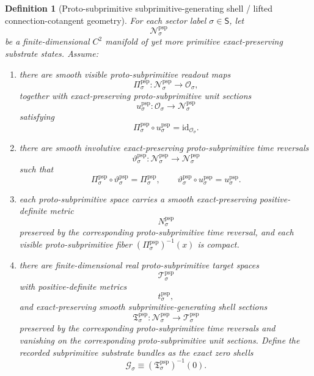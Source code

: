 \documentclass[11pt]{article}
\newcommand{\SectorSet}{\mathsf S}
\newcommand{\ObjClass}[1]{\mathcal O_{#1}}
\newcommand{\ProtoSubprimTarget}[1]{\mathcal T_{#1}^{\mathrm{psp}}}
\newcommand{\ProtoSubprimTargetMetric}[1]{t_{#1}^{\mathrm{psp}}}
\newcommand{\SubprimSpace}[1]{\mathcal G_{#1}}
\newcommand{\ProtoSubprimSpace}[1]{\mathcal N_{#1}^{\mathrm{psp}}}
\newcommand{\ProtoSubprimRead}[1]{\Pi_{#1}^{\mathrm{psp}}}
\newcommand{\ProtoSubprimUnit}[1]{u_{#1}^{\mathrm{psp}}}
\newcommand{\ProtoSubprimTimeRev}[1]{\vartheta_{#1}^{\mathrm{psp}}}
\newcommand{\ProtoSubprimMetric}[1]{N_{#1}^{\mathrm{psp}}}
\newcommand{\ProtoSubprimSection}[1]{\mathfrak T_{#1}^{\mathrm{psp}}}
\newtheorem{definition}{Definition}
\begin{document}
\begin{definition}[Proto-subprimitive subprimitive-generating shell / lifted connection-cotangent geometry]
\label{def:protosubprimitive_geometry}
For each sector label \(\sigma\in\SectorSet\), let
\[
\ProtoSubprimSpace{\sigma}
\]
be a finite-dimensional \(C^2\) manifold of yet more primitive exact-preserving substrate states. Assume:
\begin{enumerate}
    \item there are smooth visible proto-subprimitive readout maps
    \[
    \ProtoSubprimRead{\sigma}:\ProtoSubprimSpace{\sigma}\to\ObjClass{\sigma},
    \]
    together with exact-preserving proto-subprimitive unit sections
    \[
    \ProtoSubprimUnit{\sigma}:\ObjClass{\sigma}\to\ProtoSubprimSpace{\sigma}
    \]
    satisfying
    \[
    \ProtoSubprimRead{\sigma}\circ\ProtoSubprimUnit{\sigma}=\mathrm{id}_{\ObjClass{\sigma}}.
    \]
    \item there are smooth involutive exact-preserving proto-subprimitive time reversals
    \[
    \ProtoSubprimTimeRev{\sigma}:\ProtoSubprimSpace{\sigma}\to\ProtoSubprimSpace{\sigma}
    \]
    such that
    \[
    \ProtoSubprimRead{\sigma}\circ\ProtoSubprimTimeRev{\sigma}=\ProtoSubprimRead{\sigma},
    \qquad
    \ProtoSubprimTimeRev{\sigma}\circ\ProtoSubprimUnit{\sigma}=\ProtoSubprimUnit{\sigma}.
    \]
    \item each proto-subprimitive space carries a smooth exact-preserving positive-definite metric
    \[
    \ProtoSubprimMetric{\sigma}
    \]
    preserved by the corresponding proto-subprimitive time reversal, and each visible proto-subprimitive fiber \((\ProtoSubprimRead{\sigma})^{-1}(x)\) is compact.
    \item there are finite-dimensional real proto-subprimitive target spaces
    \[
    \ProtoSubprimTarget{\sigma}
    \]
    with positive-definite metrics
    \[
    \ProtoSubprimTargetMetric{\sigma},
    \]
    and exact-preserving smooth subprimitive-generating shell sections
    \[
    \ProtoSubprimSection{\sigma}:\ProtoSubprimSpace{\sigma}\to\ProtoSubprimTarget{\sigma}
    \]
    preserved by the corresponding proto-subprimitive time reversals and vanishing on the corresponding proto-subprimitive unit sections. Define the recorded subprimitive substrate bundles as the exact zero shells
    \begin{equation}
    \SubprimSpace{\sigma}\equiv \left(\ProtoSubprimSection{\sigma}\right)^{-1}(0).
    \label{eq:subprimitive_shell_from_protosubprimitive}
    \end{equation}

\end{enumerate}
\end{definition}
\end{document}
